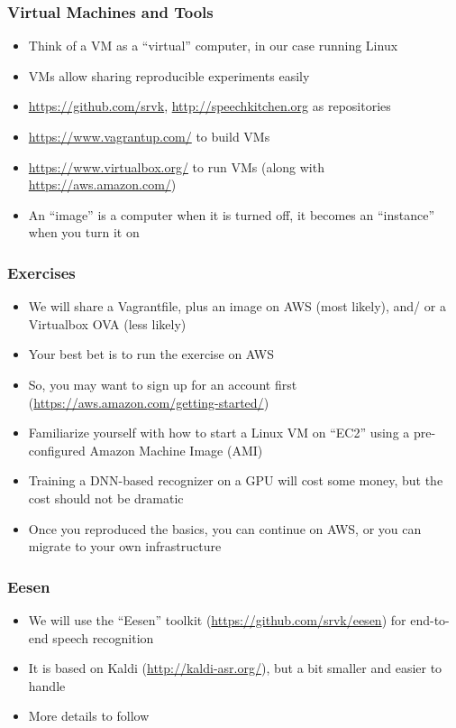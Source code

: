 \begin{frame}
  \frametitle{Virtual Machines and Tools}
  \begin{itemize}
  \item Think of a VM as a ``virtual'' computer, in our case running Linux
  \item VMs allow sharing reproducible experiments easily
  \item \url{https://github.com/srvk}, \url{http://speechkitchen.org} as repositories
  \item \url{https://www.vagrantup.com/} to build VMs
  \item \url{https://www.virtualbox.org/} to run VMs (along with \url{https://aws.amazon.com/})
  \item An ``image'' is a computer when it is turned off, it becomes an ``instance'' when you turn it on
  \end{itemize}
\end{frame}

\begin{frame}
  \frametitle{Exercises}
  \begin{itemize}
  \item We will share a Vagrantfile, plus an image on AWS (most likely), and/ or a Virtualbox OVA (less likely)
  \item Your best bet is to run the exercise on AWS
  \item So, you may want to sign up for an account first (\url{https://aws.amazon.com/getting-started/})
  \item Familiarize yourself with how to start a Linux VM on ``EC2'' using a pre-configured Amazon Machine Image (AMI)
  \item Training a DNN-based recognizer on a GPU will cost some money, but the cost should not be dramatic
  \item Once you reproduced the basics, you can continue on AWS, or you can migrate to your own infrastructure
  \end{itemize}
\end{frame}

\begin{frame}
  \frametitle{Eesen}
  \begin{itemize}
  \item We will use the ``Eesen'' toolkit (\url{https://github.com/srvk/eesen}) for end-to-end speech recognition
  \item It is based on Kaldi (\url{http://kaldi-asr.org/}), but a bit smaller and easier to handle
  \item {\color{Maroon} More details to follow}
  \end{itemize}
\end{frame}


